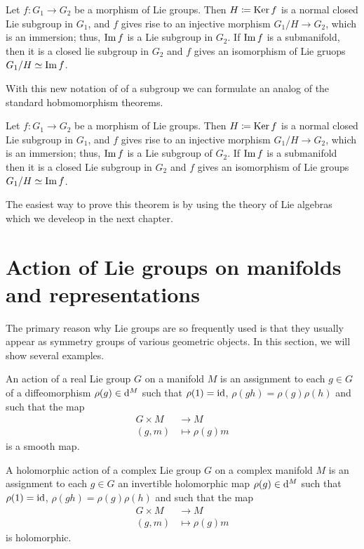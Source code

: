 \begin{theorem}
Let $f\colon G_1\to G_2$ be a morphism of Lie groups. Then $H\coloneq\operatorname{Ker}
f$ is a normal closed Lie subgroup in $G_1$, and $f$ gives rise to an
injective morphism $G_1/H\to G_2$, which is an immersion; thus, $\operatorname{Im} f$ is
a Lie subgroup in $G_2$. If $\operatorname{Im} f$ is a submanifold, then it is a closed
lie subgroup in $G_2$ and $f$ gives an isomorphism of Lie gruops
$G_1/H\simeq\operatorname{Im} f$.
\end{theorem}

With this new notation of of a subgroup we can formulate an analog of the
standard hobmomorphism theorems.
\begin{theorem}
  Let $f\colon G_1\to G_2$ be a morphism of Lie groups. Then
  $H\coloneq\operatorname{Ker} f$ is a normal closed Lie subgroup in $G_1$, and $f$ gives
  rise to an injective morphism $G_1/H\to G_2$, which is an immersion;
  thus, $\operatorname{Im} f$ is a Lie subgroup of $G_2$. If $\operatorname{Im} f$ is a submanifold
  then it is a closed Lie subgroup in $G_2$ and $f$ gives an isomorphism of
  Lie groups $G_1/H\simeq\operatorname{Im} f$.
\end{theorem}

The easiest way to prove this theorem is by using the theory of Lie
algebras which we develeop in the next chapter.

\section{Action of Lie groups on manifolds and representations}
The primary reason why Lie groups are so frequently used is that they
usually appear as symmetry groups of various geometric objects. In this
section, we will show several examples.

\begin{definition}
  An action of a real Lie group $G$ on a manifold $M$ is an assignment to
  each $g\in G$ of a diffeomorphism $\rho(g)\in\mathop{}\!{\mathrm{d}^M}$ such that
  $\rho(1)=\operatorname{id}$, $\rho(gh)=\rho(g)\rho(h)$ and such that the map
  \[
    \begin{aligned}
      G\times M&\longrightarrow M\\
      (g,m)&\longmapsto \rho(g)m
    \end{aligned}
  \]
  is a smooth map.
\end{definition}

A holomorphic action of a complex Lie group $G$ on a complex manifold $M$
is an assignment to each $g\in G$ an invertible holomorphic map
$\rho(g)\in\mathop{}\!{\mathrm{d}^M}$ such that $\rho(1)=\operatorname{id}$, $\rho(gh)=\rho(g)\rho(h)$ and
such that the map
\[
  \begin{aligned}
    G\times M&\longrightarrow M\\
    (g,m)&\longmapsto \rho(g)m
  \end{aligned}
\]
is holomorphic.


